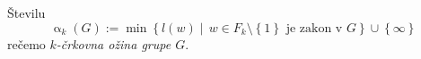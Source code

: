 \begin{primer}
    

\end{primer}

\begin{definicija}\label{def_ozina}
    Številu \begin{equation*}
    \operatorname{\alpha}_{k}(G) := \min \left\{ l(w)  \middle|\,  w \in F_k \setminus \left\{ 1\right\} \text{ je zakon v } G  \right\} \cup \left\{ \infty\right\} 
    \end{equation*}  
    rečemo \emph{$k$-črkovna ožina grupe $G$}.  
    \end{definicija}
    

